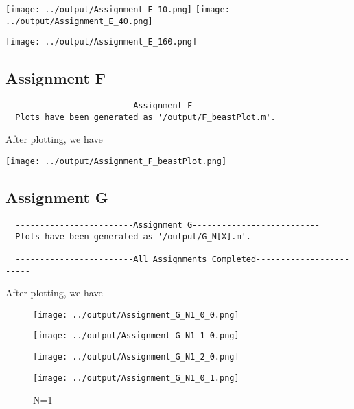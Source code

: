 \documentclass{article}
\begin{document}
\texttt{[image: ../output/Assignment\_E\_10.png]}
\texttt{[image: ../output/Assignment\_E\_40.png]}

\texttt{[image: ../output/Assignment\_E\_160.png]}

\subsection{\textbf{Assignment F}}
\lstset{language=C++}
\begin{lstlisting}
  ------------------------Assignment F--------------------------
  Plots have been generated as '/output/F_beastPlot.m'.
\end{lstlisting}
After plotting, we have

\texttt{[image: ../output/Assignment\_F\_beastPlot.png]}


\subsection{\textbf{Assignment G}}
\lstset{language=C++}
\begin{lstlisting}
  ------------------------Assignment G--------------------------
  Plots have been generated as '/output/G_N[X].m'.
  
  ------------------------All Assignments Completed------------------------
\end{lstlisting}
After plotting, we have

\begin{figure}[!htbp]
  \flushleft
  \subfigure
  {
  \begin{minipage}[b]{.3\linewidth}
    \flushleft
  \texttt{[image: ../output/Assignment\_G\_N1\_0\_0.png]}
  \end{minipage}
  }
  \subfigure
  {
  \begin{minipage}[b]{.3\linewidth}
    \flushleft
  \texttt{[image: ../output/Assignment\_G\_N1\_1\_0.png]}
  \end{minipage}
  }
  \subfigure
  {
  \begin{minipage}[b]{.3\linewidth}
    \flushleft
  \texttt{[image: ../output/Assignment\_G\_N1\_2\_0.png]}
  \end{minipage}
  }
  \subfigure
  {
  \begin{minipage}[b]{.3\linewidth}
    \flushleft
  \texttt{[image: ../output/Assignment\_G\_N1\_0\_1.png]}
  \end{minipage}
  }
  \newline
  \caption{N=1}
  \end{figure}
\end{document}
